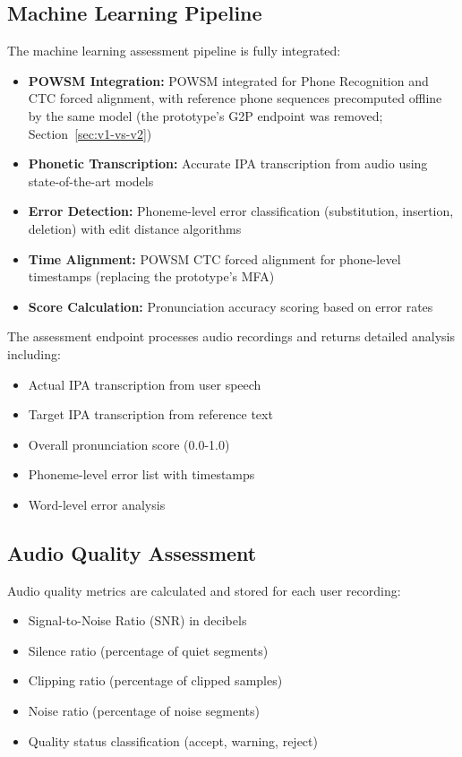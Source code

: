 \documentclass[a4paper,12pt]{report}
\begin{document}
\subsection{Machine Learning Pipeline}

The machine learning assessment pipeline is fully integrated:

\begin{itemize}
    \item \textbf{POWSM Integration:} POWSM \cite{powsm} integrated for Phone Recognition and CTC forced alignment, with reference phone sequences precomputed offline by the same model (the prototype's G2P endpoint was removed; Section~\ref{sec:v1-vs-v2})
    \item \textbf{Phonetic Transcription:} Accurate IPA transcription from audio using state-of-the-art models
    \item \textbf{Error Detection:} Phoneme-level error classification (substitution, insertion, deletion) with edit distance algorithms
    \item \textbf{Time Alignment:} POWSM CTC forced alignment for phone-level timestamps (replacing the prototype's MFA)
    \item \textbf{Score Calculation:} Pronunciation accuracy scoring based on error rates
\end{itemize}

The assessment endpoint processes audio recordings and returns detailed analysis including:
\begin{itemize}
    \item Actual IPA transcription from user speech
    \item Target IPA transcription from reference text
    \item Overall pronunciation score (0.0-1.0)
    \item Phoneme-level error list with timestamps
    \item Word-level error analysis
\end{itemize}

\subsection{Audio Quality Assessment}

Audio quality metrics are calculated and stored for each user recording:
\begin{itemize}
    \item Signal-to-Noise Ratio (SNR) in decibels
    \item Silence ratio (percentage of quiet segments)
    \item Clipping ratio (percentage of clipped samples)
    \item Noise ratio (percentage of noise segments)
    \item Quality status classification (accept, warning, reject)
\end{itemize}
\end{document}
